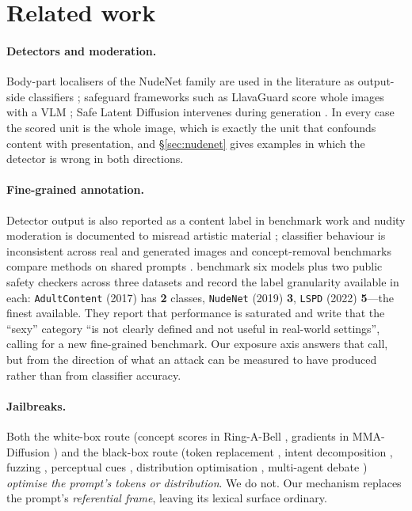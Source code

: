 \documentclass[11pt]{article}
\begin{document}
\section{Related work}
\label{sec:related}

\paragraph{Detectors and moderation.} Body-part localisers of the NudeNet
family are used in the literature as output-side classifiers
\citep[Table~1]{crack}; safeguard frameworks such as LlavaGuard score whole
images with a VLM \citep{llavaguard,shieldgemma2}; Safe Latent Diffusion
intervenes during generation \citep{sld}. In every case the scored unit is the whole image, which
is exactly the unit that confounds content with presentation, and
\S\ref{sec:nudenet} gives examples in which the detector is wrong in both
directions.

\paragraph{Fine-grained annotation.} Detector output is also reported as a
content label in benchmark work \citep{nudenet,safesearch} and nudity
moderation is documented to misread artistic material \citep{artcentric};
classifier behaviour is inconsistent across real and generated images
\citep{unsafebench} and concept-removal benchmarks compare methods on shared
prompts \citep{sixcd}. \citet{nuditysota} benchmark six models
plus two public safety checkers across three datasets and record the label
granularity available in each: \texttt{AdultContent} (2017) has \textbf{2}
classes, \texttt{NudeNet} (2019) \textbf{3}, \texttt{LSPD} (2022)
\textbf{5}---the finest available. They report that performance is saturated
and write that the ``sexy'' category ``is not clearly defined and not useful in
real-world settings'', calling for a new fine-grained benchmark. Our exposure
axis answers that call, but from the direction of what an attack can be
measured to have produced rather than from classifier accuracy.

\paragraph{Jailbreaks.} Both the white-box route (concept scores in
Ring-A-Bell \citep{ringabell}, gradients in MMA-Diffusion
\citep{mmadiffusion}) and the black-box route (token replacement
\citep{sneakyprompt}, intent decomposition \citep{daca}, fuzzing
\citep{jailfuzzer}, perceptual cues \citep{pgj}, distribution optimisation
\citep{janus}, multi-agent debate \citep{crack}) \emph{optimise the prompt's
tokens or distribution}. We do not. Our mechanism replaces the prompt's
\emph{referential frame}, leaving its lexical surface ordinary.
\end{document}
